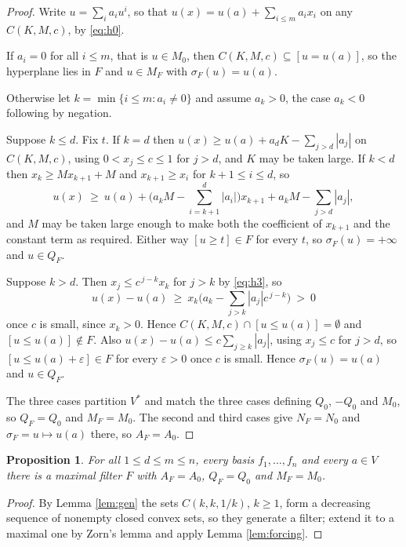 \documentclass[11pt]{amsart}
\theoremstyle{plain}
\newtheorem{proposition}[theorem]{Proposition}
\theoremstyle{definition}
\newcommand{\Vs}{V^{*}}
\begin{document}
\begin{proof}
Write $u=\sum_ia_iu^{i}$, so that $u(x)=u(a)+\sum_{i\le m}a_ix_i$ on any $C(K,M,c)$, by \eqref{eq:h0}.

If $a_i=0$ for all $i\le m$, that is $u\in M_0$, then $C(K,M,c)\subseteq[u=u(a)]$, so the hyperplane lies in $F$ and $u\in M_F$ with $\sigma_F(u)=u(a)$.

Otherwise let $k=\min\{i\le m:a_i\neq0\}$ and assume $a_k>0$, the case $a_k<0$ following by negation.

Suppose $k\le d$. Fix $t$. If $k=d$ then $u(x)\ge u(a)+a_dK-\sum_{j>d}|a_j|$ on $C(K,M,c)$, using $0<x_j\le c\le1$ for $j>d$, and $K$ may be taken large. If $k<d$ then $x_k\ge Mx_{k+1}+M$ and $x_{k+1}\ge x_i$ for $k+1\le i\le d$, so
\[
u(x)\ \ge\ u(a)+\Big(a_kM-\sum_{i=k+1}^{d}|a_i|\Big)x_{k+1}+a_kM-\sum_{j>d}|a_j|,
\]
and $M$ may be taken large enough to make both the coefficient of $x_{k+1}$ and the constant term as required. Either way $[u\ge t]\in F$ for every $t$, so $\sigma_F(u)=+\infty$ and $u\in Q_F$.

Suppose $k>d$. Then $x_j\le c^{\,j-k}x_k$ for $j>k$ by \eqref{eq:h3}, so
\[
u(x)-u(a)\ \ge\ x_k\Big(a_k-\sum_{j>k}|a_j|c^{\,j-k}\Big)\ >\ 0
\]
once $c$ is small, since $x_k>0$. Hence $C(K,M,c)\cap[u\le u(a)]=\emptyset$ and $[u\le u(a)]\notin F$. Also $u(x)-u(a)\le c\sum_{j\ge k}|a_j|$, using $x_j\le c$ for $j>d$, so $[u\le u(a)+\varepsilon]\in F$ for every $\varepsilon>0$ once $c$ is small. Hence $\sigma_F(u)=u(a)$ and $u\in Q_F$.

The three cases partition $\Vs$ and match the three cases defining $Q_0$, $-Q_0$ and $M_0$, so $Q_F=Q_0$ and $M_F=M_0$. The second and third cases give $N_F=N_0$ and $\sigma_F=u\mapsto u(a)$ there, so $A_F=A_0$.
\end{proof}

\begin{proposition}\label{prop:exists}
For all $1\le d\le m\le n$, every basis $f_1,\dots,f_n$ and every $a\in V$ there is a maximal filter $F$ with $A_F=A_0$, $Q_F=Q_0$ and $M_F=M_0$.
\end{proposition}

\begin{proof}
By Lemma \ref{lem:gen} the sets $C(k,k,1/k)$, $k\ge1$, form a decreasing sequence of nonempty closed convex sets, so they generate a filter; extend it to a maximal one by Zorn's lemma and apply Lemma \ref{lem:forcing}.
\end{proof}
\end{document}
